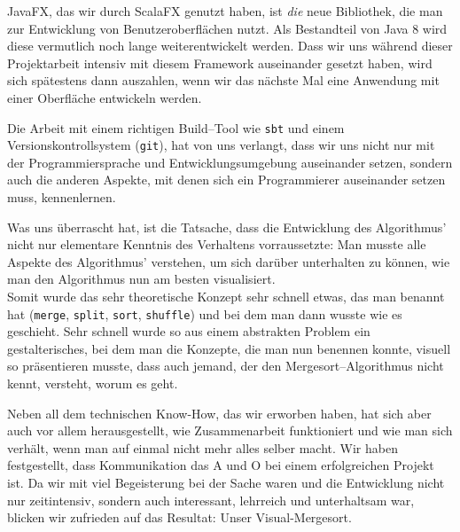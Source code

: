 JavaFX, das wir durch ScalaFX genutzt haben, ist \textit{die} neue Bibliothek, die man zur Entwicklung von Benutzeroberflächen nutzt. Als Bestandteil von Java 8 wird diese vermutlich noch lange weiterentwickelt werden. Dass wir uns während dieser Projektarbeit intensiv mit diesem Framework auseinander gesetzt haben, wird sich spätestens dann auszahlen, wenn wir das nächste Mal eine Anwendung mit einer Oberfläche entwickeln werden.

Die Arbeit mit einem richtigen Build--Tool wie \texttt{sbt} und einem Versionskontrollsystem (\texttt{git}), hat von uns verlangt, dass wir uns nicht nur mit der Programmiersprache und Entwicklungsumgebung auseinander setzen, sondern auch die anderen Aspekte, mit denen sich ein Programmierer auseinander setzen muss, kennenlernen.

Was uns überrascht hat, ist die Tatsache, dass die Entwicklung des Algorithmus' nicht nur elementare Kenntnis des Verhaltens vorraussetzte: Man musste alle Aspekte des Algorithmus' verstehen, um sich darüber unterhalten zu können, wie man den Algorithmus nun am besten visualisiert.\\
Somit wurde das sehr theoretische Konzept sehr schnell etwas, das man benannt hat (\texttt{merge}, \texttt{split}, \texttt{sort}, \texttt{shuffle}) und bei dem man dann wusste wie es geschieht. Sehr schnell wurde so aus einem abstrakten Problem ein gestalterisches, bei dem man die Konzepte, die man nun benennen konnte, visuell so präsentieren musste, dass auch jemand, der den Mergesort--Algorithmus nicht kennt, versteht, worum es geht.

Neben all dem technischen Know-How, das wir erworben haben, hat sich aber auch vor allem herausgestellt, wie Zusammenarbeit funktioniert und wie man sich verhält, wenn man auf einmal nicht mehr alles selber macht. Wir haben festgestellt, dass Kommunikation das A und O bei einem erfolgreichen Projekt ist. Da wir mit viel Begeisterung bei der Sache waren und die Entwicklung nicht nur zeitintensiv, sondern auch interessant, lehrreich und unterhaltsam war, blicken wir zufrieden auf das Resultat: Unser Visual-Mergesort.
